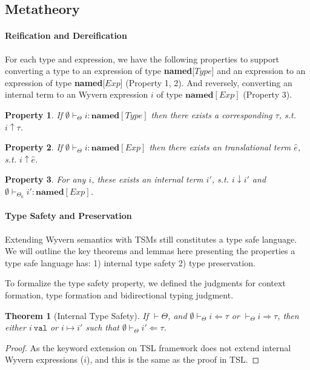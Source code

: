 \documentclass{sig-alternate}
\newtheorem{theorem}{Theorem}
\newtheorem{property}{Property}
\begin{document}
\subsection{Metatheory}
\paragraph{Reification and Dereification}
For each type and expression, we have the following properties to support converting a type to an expression of type \textbf{named}[$Type$] and an expression to an expression of type \textbf{named}[$Exp$] (Property 1, 2). And reversely, converting an internal term to an Wyvern expression $i$ of type $\mathbf{named}[Exp]$ (Property 3).  
\begin{property}If $\emptyset\vdash_{\Theta} i:\mathbf{named}[Type]$ then there exists a corresponding $\tau$, s.t. $i\uparrow\tau$. 
\end{property}
\begin{property}
If $\emptyset\vdash_{\Theta} i:\mathbf{named}[Exp]$ then there exists an translational term $\hat{e}$, s.t. $i\uparrow\hat{e}$.
\end{property}

\begin{property}
For any $i$, these exists an internal term $i'$, s.t. $i\downarrow i'$ and $\emptyset\vdash_{\Theta_0} i':\mathbf{named}[Exp]$.
\end{property}

\paragraph{Type Safety and Preservation}
Extending Wyvern semantics with TSMs still constitutes a type safe language. We will outline the key theorems and lemmas here presenting the properties a type safe language has: 1) internal type safety 2) type preservation. 

To formalize the type safety property, we defined the judgments for context formation, type formation and bidirectional typing judgment. 

\begin{theorem}[Internal Type Safety]
If $\vdash\Theta$, and $\emptyset\vdash_{\Theta}i\Leftarrow\tau$ or $\vdash_{\Theta}i\Rightarrow\tau$, then either $i~\texttt{val}$ or $i\mapsto i'$ such that $\emptyset\vdash_{\Theta}i'\Leftarrow\tau$.
\end{theorem}
\begin{proof}
As the keyword extension on TSL framework does not extend internal Wyvern expressions ($i$), and this is the same as the proof in TSL. 
\end{proof}
\end{document}
